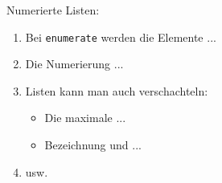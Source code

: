 \documentclass{article}
\begin{document}
Numerierte Listen:
\begin{enumerate}
 
\item Bei \texttt{enumerate}
werden die Elemente ...
 
\item Die Numerierung ...
 
\item Listen kann man auch
verschachteln:
  \begin{itemize}
  \item Die maximale ...
  \item Bezeichnung und ...
  \end{itemize}
 
\item usw.
\end{enumerate}
   
\end{document}
